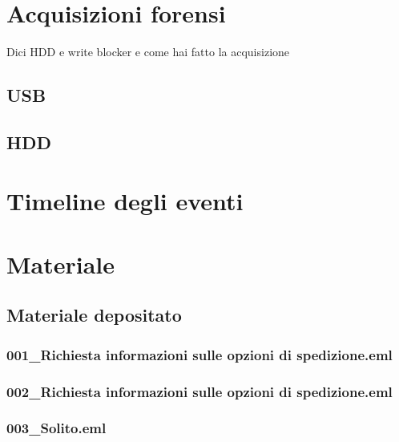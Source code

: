 \documentclass[a4paper,12pt]{report}
\begin{document}
\pagebreak

\chapter{Acquisizioni forensi}
Dici HDD e write blocker e come hai fatto la acquisizione


\section{USB}


\section{HDD}


\pagebreak

\chapter{Timeline degli eventi}







\chapter{Materiale}
\section{Materiale depositato}

\subsection{001\_Richiesta informazioni sulle opzioni di spedizione.eml}
\vspace{5pt}


\subsection{002\_Richiesta informazioni sulle opzioni di spedizione.eml}
\vspace{5pt}


\subsection{003\_Solito.eml}
\vspace{5pt}

\end{document}
